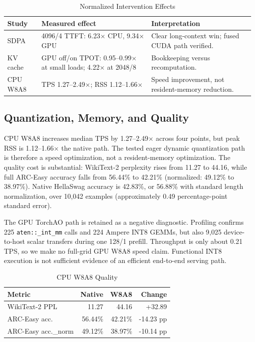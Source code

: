 \documentclass[conference]{IEEEtran}
\begin{document}
\begin{table}[t]
\caption{Normalized Intervention Effects}
\label{tab:interventions}
\centering
\small
\setlength{\tabcolsep}{3.5pt}
\begin{tabularx}{\columnwidth}{@{}lYY@{}}
\toprule
\textbf{Study} & \textbf{Measured effect} & \textbf{Interpretation} \\
\midrule
SDPA &
4096/4 TTFT: 6.23$\times$ CPU, 9.34$\times$ GPU &
Clear long-context win; fused CUDA path verified. \\
KV cache &
GPU off/on TPOT: 0.95--0.99$\times$ at small loads; 4.22$\times$ at 2048/8 &
Bookkeeping versus recomputation. \\
CPU W8A8 &
TPS 1.27--2.49$\times$; RSS 1.12--1.66$\times$ &
Speed improvement, not resident-memory reduction. \\
\bottomrule
\end{tabularx}
\end{table}

\subsection{Quantization, Memory, and Quality}

CPU W8A8 increases median TPS by 1.27--2.49$\times$ across four points, but
peak RSS is 1.12--1.66$\times$ the native path. The tested eager dynamic
quantization path is therefore a speed optimization, not a resident-memory
optimization. The quality cost is substantial: WikiText-2 perplexity rises
from 11.27 to 44.16, while full ARC-Easy accuracy falls from 56.44\% to
42.21\% (normalized: 49.12\% to 38.97\%). Native HellaSwag accuracy is
42.83\%, or 56.88\% with standard length normalization, over 10,042 examples
(approximately 0.49 percentage-point standard error).

The GPU TorchAO path is retained as a negative diagnostic. Profiling confirms
225 \texttt{aten::\_int\_mm} calls and 224 Ampere INT8 GEMMs, but also 9,025
device-to-host scalar transfers during one 128/1 prefill. Throughput is only
about 0.21 TPS, so we make no full-grid GPU W8A8 speed claim. Functional INT8
execution is not sufficient evidence of an efficient end-to-end serving
path.

\begin{table}[t]
\caption{CPU W8A8 Quality}
\label{tab:quality}
\centering
\small
\begin{tabular}{@{}lrrr@{}}
\toprule
\textbf{Metric} & \textbf{Native} & \textbf{W8A8} & \textbf{Change} \\
\midrule
WikiText-2 PPL & 11.27 & 44.16 & +32.89 \\
ARC-Easy acc. & 56.44\% & 42.21\% & -14.23 pp \\
ARC-Easy acc.\_norm & 49.12\% & 38.97\% & -10.14 pp \\
\bottomrule
\end{tabular}
\end{table}
\end{document}
